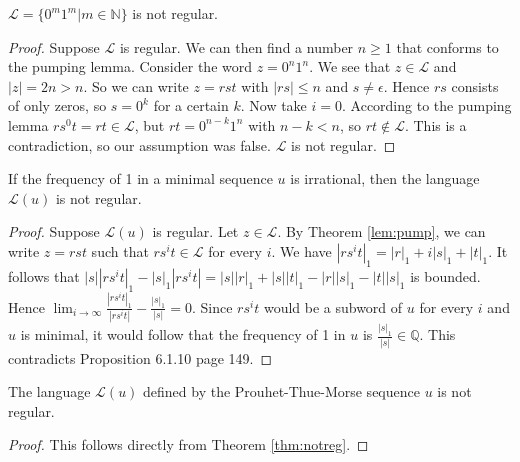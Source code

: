\documentclass{article}
\begin{document}
\begin{example} \label{ex:pump}
$\mathcal{L} = \{0^m1^m | m \in \mathbb{N}\}$ is not regular.
\end{example}

\begin{proof}
Suppose $\mathcal{L}$ is regular. We can then find a number $n \ge 1$ that
conforms to the pumping lemma. Consider the word $z = 0^n 1^n$. We see that 
$z \in \mathcal{L}$ and $|z| = 2n > n$. So we can write $z = r s t$ with 
$|r s| \le n$ and $s \ne \epsilon$. Hence $rs$ consists of only zeros, so 
$s = 0^k$ for a certain $k$. Now take $i = 0$. According to the pumping lemma
$r s^0 t = r t \in \mathcal{L}$, but $r t = 0^{n - k} 1^n$ with $n - k < n$, so
$rt \notin \mathcal{L}$. This is a contradiction, so our assumption was false.
$\mathcal{L}$ is not regular. 
\end{proof}

\begin{theorem} \label{thm:notreg}
If the frequency of 1 in a minimal sequence $u$ is irrational, then the 
language $\mathcal{L}(u)$ is not regular.
\end{theorem}

\begin{proof}
Suppose $\mathcal{L}(u)$ is regular. Let $z \in \mathcal{L}$. By Theorem 
\ref{lem:pump}, we can write $z = r s t$ such that $r s^i t \in \mathcal{L}$ 
for every $i$. We have $|r s^i t|_1 = |r|_1 + i|s|_1 + |t|_1$. It follows that
$|s| |r s^i t|_1 - |s|_1 |r s^i t| = |s| |r|_1 + |s| |t|_1 - |r| |s|_1 - 
|t| |s|_1$ is bounded. Hence $\lim_{i \to \infty} 
\frac{|r s^i t|_1}{|r s^i t|} - \frac{|s|_1}{|s|} = 0$. Since $r s^i t$ would
be a subword of $u$ for every $i$ and $u$ is minimal, it would follow that the
frequency of 1 in $u$ is $\frac{|s|_1}{|s|} \in \mathbb{Q}$. This contradicts
Proposition 6.1.10 \cite{Fogg} page 149. 
\end{proof}

\begin{corollary} \label{cor:ptmnotreg}
The language $\mathcal{L}(u)$ defined by the Prouhet-Thue-Morse sequence $u$ is
not regular.
\end{corollary}

\begin{proof} 
This follows directly from Theorem \ref{thm:notreg}.
\end{proof}
\end{document}
